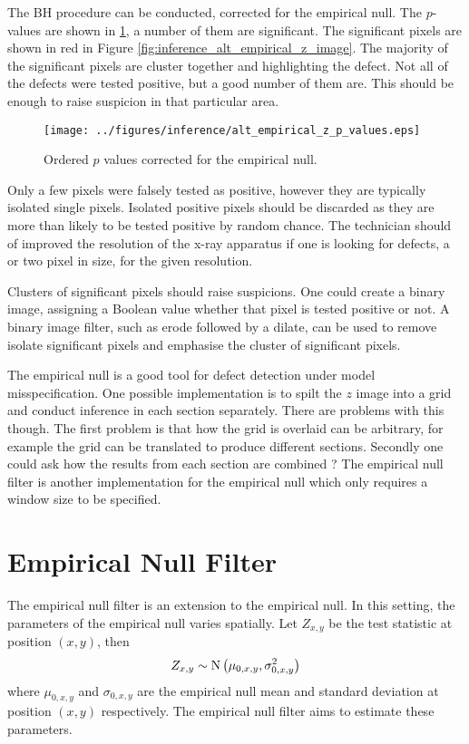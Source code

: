 The BH procedure can be conducted, corrected for the empirical null. The $p$-values are shown in \ref{fig:inference_alt_empirical_z_p_values}, a number of them are significant. The significant pixels are shown in red in Figure \ref{fig:inference_alt_empirical_z_image}. The majority of the significant pixels are cluster together and highlighting the defect. Not all of the defects were tested positive, but a good number of them are. This should be enough to raise suspicion in that particular area.

\begin{figure}
	\centering
	\texttt{[image: ../figures/inference/alt\_empirical\_z\_p\_values.eps]}
	\caption{Ordered $p$ values corrected for the empirical null.}
	\label{fig:inference_alt_empirical_z_p_values}
\end{figure}

Only a few pixels were falsely tested as positive, however they are typically isolated single pixels. Isolated positive pixels should be discarded as they are more than likely to be tested positive by random chance. The technician should of improved the resolution of the x-ray apparatus if one is looking for defects, a or two pixel in size, for the given resolution.

Clusters of significant pixels should raise suspicions. One could create a binary image, assigning a Boolean value whether that pixel is tested positive or not. A binary image filter, such as erode followed by a dilate, can be used to remove isolate significant pixels and emphasise the cluster of significant pixels.

The empirical null is a good tool for defect detection under model misspecification. One possible implementation is to spilt the $z$ image into a grid and conduct inference in each section separately. There are problems with this though. The first problem is that how the grid is overlaid can be arbitrary, for example the grid can be translated to produce different sections. Secondly one could ask how the results from each section are combined \citep{efron2008simultaneous}? The empirical null filter is another implementation for the empirical null which only requires a window size to be specified.


\section{Empirical Null Filter}

The empirical null filter is an extension to the empirical null. In this setting, the parameters of the empirical null varies spatially. Let $Z_{x,y}$ be the test statistic at position $(x,y)$, then
\begin{equation}
	Z_{x,y}\sim\operatorname{N}\left(
		\mu_{0,x,y},\sigma_{0,x,y}^2
	\right)
\end{equation}
where $\mu_{0,x,y}$ and $\sigma_{0,x,y}$ are the empirical null mean and standard deviation at position $(x,y)$ respectively. The empirical null filter aims to estimate these parameters.

